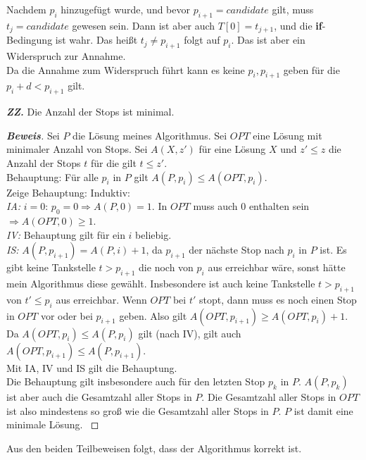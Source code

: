 \documentclass{scrartcl}
\newcommand{\loes}[2]{\vspace{0.5cm}\\\medskip\noindent{{\bf Lösung zu Aufgabe #1}\\
{#2}}}
\newcommand{\bew}[2]{
{\textbf{\textit{ZZ.}} }{#1}\\
{\begin{proof}[{\textbf{\textit{Beweis}}}] {#2} \end{proof}}}
\begin{document}
{{{    Nachdem $p_i$ hinzugefügt wurde, und bevor $p_{i+1} = candidate$ gilt, muss $t_j = candidate$ gewesen sein. Dann ist aber auch $T[0] = t_{j+1}$, und die \textbf{if}-Bedingung ist wahr. Das heißt $t_j \neq p_{i+1}$ folgt auf $p_i$. Das ist aber ein Widerspruch zur Annahme.\\
    Da die Annahme zum Widerspruch führt kann es keine $p_i, p_{i+1}$ geben für die $p_i + d < p_{i+1}$ gilt.
  }
  \bew{Die Anzahl der Stops ist minimal.}{
    Sei $P$ die Lösung meines Algorithmus. Sei $OPT$ eine Lösung mit minimaler Anzahl von Stops. Sei $A(X, z')$ für eine Lösung $X$ und $z'\leq z$ die Anzahl der Stops $t$ für die gilt $t \leq z'$.\\
    Behauptung: Für alle $p_i$ in $P$ gilt $A(P, p_i) \leq A(OPT, p_i)$.\\
    Zeige Behauptung: Induktiv:\\
    \textit{IA:} $i = 0$: $p_0 = 0 \Rightarrow A(P, 0) = 1$. In $OPT$ muss auch $0$ enthalten sein $\Rightarrow A(OPT, 0) \geq 1$.\\
    \textit{IV:} Behauptung gilt für ein $i$ beliebig.\\
    \textit{IS:} $A(P, p_{i+1}) = A(P, i) + 1$, da $p_{i+1}$ der nächste Stop nach $p_i$ in $P$ ist. Es gibt keine Tankstelle $t > p_{i+1}$ die noch von $p_i$ aus erreichbar wäre, sonst hätte mein Algorithmus diese gewählt. Insbesondere ist auch keine Tankstelle $t > p_{i+1}$ von $t' \leq p_i$ aus erreichbar. Wenn $OPT$ bei $t'$ stopt, dann muss es noch einen Stop in $OPT$ vor oder bei $p_{i+1}$ geben. Also gilt $A(OPT, p_{i+1}) \geq A(OPT, p_i) + 1$. Da $A(OPT, p_i) \leq A(P, p_i)$ gilt (nach IV), gilt auch $A(OPT, p_{i+1}) \leq A(P, p_{i+1})$.\\
    Mit IA, IV und IS gilt die Behauptung.\\
    Die Behauptung gilt insbesondere auch für den letzten Stop $p_k$ in $P$. $A(P, p_k)$ ist aber auch die Gesamtzahl aller Stops in $P$. Die Gesamtzahl aller Stops in $OPT$ ist also mindestens so groß wie die Gesamtzahl aller Stops in $P$. $P$ ist damit eine minimale Lösung.
  }
  Aus den beiden Teilbeweisen folgt, dass der Algorithmus korrekt ist.
}
}
\pagebreak
\loes{2}{
-
}
\end{document}
